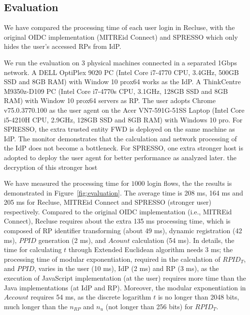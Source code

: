 \subsection{Evaluation}
\label{sec:evaluation}
We have compared the processing time of each user login in Recluse, with the original OIDC implementation (MITREid Connect) and SPRESSO which only hides the user's accessed RPs from IdP.

 We run the evaluation on 3 physical machines connected in a separated 1Gbps network. A DELL OptiPlex 9020 PC (Intel Core i7-4770 CPU, 3.4GHz, 500GB SSD and 8GB RAM) with Window 10 prox64 works as the IdP. A ThinkCentre M9350z-D109 PC (Intel Core i7-4770s CPU, 3.1GHz, 128GB SSD and 8GB RAM) with  Window 10 prox64 servers as RP. The user adopts Chrome v75.0.3770.100 as the user agent on the Acer VN7-591G-51SS Laptop (Intel Core i5-4210H CPU, 2.9GHz, 128GB SSD and 8GB RAM) with  Windows 10 pro. For SPRESSO, the extra trusted entity FWD is deployed on the same machine as IdP. The monitor demonstrates that  the calculation and network processing of the IdP does not become a bottleneck. For SPRESSO, one extra stronger host is adopted to deploy the user agent for better performance as analyzed later. {\color{red} the decryption of this stronger host}

 We have measured the processing time for $1000$ login flows, the the results is demonstrated in Figure~\ref{fig:evaluation}. The average time is 208 ms, 164 ms and 205 ms for Recluse, MITREid Connect and SPRESSO (stronger user) respectively. Compared to the original OIDC implementation (i.e., MITREid Connect), Recluse requires about the extra 135 ms processing time, which is composed of RP identifier transforming (about 49 ms), dynamic registration (42 ms), $PPID$ generation (2 ms), and $Acount$ calculation (54 ms). In details, the time for calculating $t$ through Extended Euclidean algorithm needs 3 ms; the processing time of modular exponentiation, required in the calculation of $RPID_T$, and $PPID$, varies in the user (10 ms), IdP (2 ms) and RP (3 ms), as the execution of  JavaScript implementation (at the user) requires more time than the Java implementations (at IdP and RP). Moreover, the modular exponentiation in $Account$ requires 54 ms, as the discrete logarithm $t$ is no longer than 2048 bits, much longer than the $n_{RP}$ and $n_{u}$ (not longer than 256 bits) for $RPID_T$.

